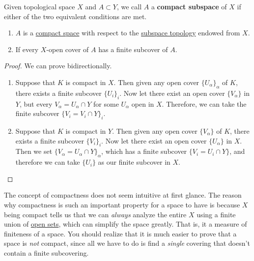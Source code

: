   \begin{definition}
    \label{def:compact-subspaces}
    Given topological space $X$ and $A \subset Y$, we call $A$ a \textbf{compact subspace} of $X$ if either of the two equivalent conditions are met. 
    \begin{enumerate}
      \item $A$ is a \hyperref[def:compact-space]{compact space} with respect to the \hyperref[def:subspace-topology]{subspace topology} endowed from $X$. 
      \item If every $X$-open cover of $A$ has a finite subcover of $A$. 
    \end{enumerate}
  \end{definition}
  \begin{proof}
    We can prove bidirectionally. 
    \begin{enumerate}
      \item Suppose that $K$ is compact in $X$. Then given any open cover $\{U_\alpha\}_\alpha$ of $K$, there exists a finite subcover $\{U_i\}_{i}$. Now let there exist an open cover $\{V_\alpha\}$ in $Y$, but every $V_\alpha = U_\alpha \cap Y$ for some $U_\alpha$ open in $X$. Therefore, we can take the finite subcover $\{V_i = V_i \cap Y\}_i$. 

      \item Suppose that $K$ is compact in $Y$. Then given any open cover $\{V_\alpha\}$ of $K$, there exists a finite subcover $\{V_i\}_i$. Now let there exist an open cover $\{U_\alpha\}$ in $X$. Then we set $\{V_\alpha = U_\alpha \cap Y\}_\alpha$, which has a finite subcover $\{V_i = U_i \cap Y\}$, and therefore we can take $\{U_i\}$ as our finite subcover in $X$. 
    \end{enumerate}
  \end{proof}
   
  The concept of compactness does not seem intuitive at first glance. The reason why compactness is such an important property for a space to have is because $X$ being compact tells us that we can \textit{always} analyze the entire $X$ using a finite union of \hyperref[def:open-set]{open sets}, which can simplify the space greatly. That is, it a measure of finiteness of a space. You should realize that it is much easier to prove that a space is \textit{not} compact, since all we have to do is find a \textit{single} covering that doesn't contain a finite subcovering. 

